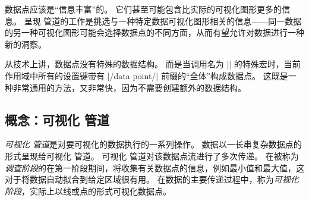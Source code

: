 数据点应该是``信息丰富''的。 它们甚至可能包含比实际的可视化图形更多的信息。 呈现 管道的工作是挑选与一种特定数据可视化图形相关的信息——同一数据的另一种可视化图形可能会选择数据点的不同方面，从而有望允许对数据进行一种新的洞察。


从技术上讲，数据点没有特殊的数据结构。 而是当调用名为 |\pgfdatapoint| 的特殊宏时，当前作用域中所有的设置键带有 |/data point/| 前缀的``全体''构成数据点。 这既是一种非常通用的方法，又非常快，因为不需要创建额外的数据结构。


\subsection{概念：可视化 管道}


\emph{可视化 管道}是对要可视化的数据执行的一系列操作。 数据以一长串复杂数据点的形式呈现给可视化 管道。 可视化 管道对该数据点流进行了多次传递。 在被称为\emph{调查阶段}的在第一阶段期间，将收集有关数据点的信息，例如最小值和最大值，这对于将数据自动拟合到给定区域很有用。 在数据的主要传递过程中，称为\emph{可视化阶段}，实际上以线或点的形式可视化数据点。

